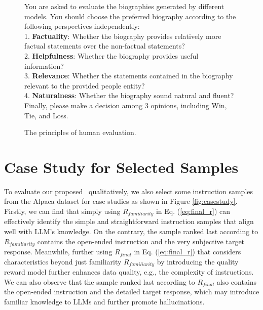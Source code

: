 \begin{figure*}[t]
    \centering
    \begin{tcolorbox}[title = {The Principles of Human Evaluation}, size=title, colframe = white, colbacktitle = black!65!white]
    \noindent   
    You are asked to evaluate the biographies generated by different models.
    You should choose the preferred biography according to the following perspectives independently: \\

    1. \textbf{Factuality}: Whether the biography provides relatively more factual statements over the non-factual statements? \\
    2. \textbf{Helpfulness}: Whether the biography provides useful information? \\
    3. \textbf{Relevance}: Whether the statements contained in the biography relevant to the provided people entity? \\
    4. \textbf{Naturalness}: Whether the biography sound natural and fluent? \\

    Finally, please make a decision among 3 opinions, including Win, Tie, and Loss.

    \end{tcolorbox}
    \caption{The principles of human evaluation.}
    \label{fig:human_evaluation_principles}
\end{figure*}



\section{Case Study for Selected Samples}
\label{appendix:cs-ss}
To evaluate our proposed \OURS~qualitatively, we also select some instruction samples from the Alpaca dataset for case studies as shown in Figure \ref{fig:casestudy}.
Firstly, we can find that simply using $R_{familiarity}$ in Eq. (\ref{eq:final_r}) can effectively identify the simple and straightforward instruction samples that align well with LLM’s knowledge.
On the contrary, the sample ranked last according to $R_{familiarity}$ contains the open-ended instruction and the very subjective target response.
Meanwhile, further using $R_{final}$ in Eq. (\ref{eq:final_r}) that considers characteristics beyond just familiarity $R_{familiarity}$ by introducing the quality reward model further enhances data quality, e.g., the complexity of instructions.
We can also observe that the sample ranked last according to $R_{final}$ also contains the open-ended instruction and the detailed target response, which may introduce familiar knowledge to LLMs and further promote hallucinations.





